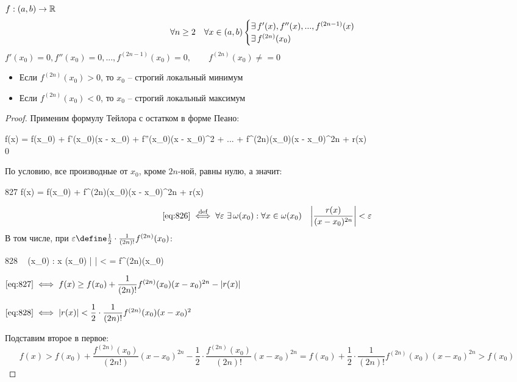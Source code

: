 \begin{theorem}
	\hfill \\
	$ f : (a, b) \to \mathbb{R} $
	$$ \forall n \ge 2 \quad \forall x \in (a, b)
	\begin{cases}
		\exists\, f'(x), f''(x), ..., f^{(2n - 1)}(x) \\
		\exists\, f^{(2n)}(x_0)
	\end{cases} $$
	$ f'(x_0) = 0, f''(x_0) = 0, ..., f^{(2n - 1)}(x_0) = 0, \qquad f^{(2n)}(x_0) \ne = 0 $
	\begin{itemize}
		\item Если $ f^{(2n)}(x_0) > 0 $, то $x_0$ -- строгий локальный минимум
		\item Если $ f^{(2n)}(x_0) < 0 $, то $x_0$ -- строгий локальный максимум
	\end{itemize}
\end{theorem}

\begin{proof}
	Применим формулу Тейлора с остатком в форме Пеано:
	\begin{mequ}
		 f(x) = f(x_0) + f'(x_0)(x - x_0) +  f''(x_0)(x - x_0)^2 + ... +  f^{(2n)}(x_0)(x - x_0)^{2n} + r(x) \\
		   0
	\end{mequ}
	По условию, все производные от $x_0$, кроме $2n$-ной, равны нулю, а значит:
	\begin{equ}{827}
		 \iff f(x) = f(x_0) + f^{(2n)}(x_0)(x - x_0)^{2n} + r(x)
	\end{equ}
	$$ \eref{826} \bydef[\iff] \forall \veps ~ \exist \omega(x_0) : \forall x \in \omega(x_0) \quad \bigg| \frac{r(x)}{(x - x_0)^{2n}} \bigg| < \veps $$
	В том числе, при $ \veps \define \frac12 \cdot \frac1{(2n)!}f^{(2n)}(x_0) $:
	\begin{equ}{828}
		 \bydef[\iff] \forall \veps ~ \exist \omega(x_0) : \forall x \in \omega(x_0) \quad \bigg|  \bigg| < \veps =  \cdot {}f^{(2n)}(x_0)
	\end{equ}
	\begin{intuition}
		$ \eref{827} \iff f(x) \ge f(x_0) + \dfrac1{(2n)!}f^{(2n)}(x_0)(x - x_0)^{2n} - |r(x)| $
	\end{intuition}
	\begin{intuition}
		$ \eref{828} \iff |r(x)| < \dfrac12 \cdot \dfrac1{(2n)!}f^{(2n)}(x_0)(x - x_0)^2 $
	\end{intuition}
	Подставим второе в первое:
	$$ f(x) > f(x_0) + \frac{f^{(2n)}(x_0)}{(2n!)}(x - x_0)^{2n} - \frac12 \cdot \frac{f^{(2n)}(x_0)}{(2n)!}(x - x_0)^{2n} = f(x_0) + \frac12 \cdot \frac1{(2n)!}f^{(2n)}(x_0)(x - x_0)^{2n} > f(x_0) $$
\end{proof}

